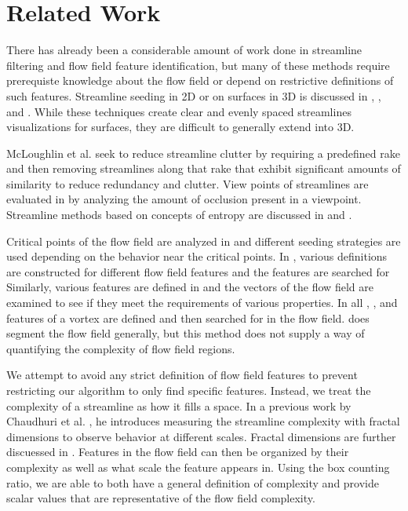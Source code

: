 \documentclass{egpubl}
\begin{document}
\section{Related Work}

There has already been a considerable amount of work done in streamline filtering and flow field feature identification, but many of these methods require prerequiste knowledge about the flow field or depend on restrictive definitions of such features.
Streamline seeding in 2D or on surfaces in 3D is discussed in \cite{turk}, \cite{mao}, and \cite{mebarki}.
While these techniques create clear and evenly spaced streamlines visualizations for surfaces, they are difficult to generally extend into 3D.

McLoughlin et al. \cite{mcloughlin} seek to reduce streamline clutter by requiring a predefined rake and then removing streamlines along that rake that exhibit significant amounts of similarity to reduce redundancy and clutter.
View points of streamlines are evaluated in \cite{marchesin} by analyzing the amount of occlusion present in a viewpoint.
Streamline methods based on concepts of entropy are discussed in \cite{shen} and \cite{lee}.

Critical points of the flow field are analyzed in \cite{ye} and different seeding strategies are used depending on the behavior near the critical points.
In \cite{salzbrunn}, various definitions are constructed for different flow field features and the features are searched for
Similarly, various features are defined in \cite{heiberg} and the vectors of the flow field are examined to see if they meet the requirements of various properties.
In all \cite{sadarjoen1999}, \cite{sadarjoen1998}, and \cite{zhong} features of a vortex are defined and then searched for in the flow field.
\cite{mahrous} does segment the flow field generally, but this method does not supply a way of quantifying the complexity of flow field regions.

We attempt to avoid any strict definition of flow field features to prevent restricting our algorithm to only find specific features.
Instead, we treat the complexity of a streamline as how it fills a space.
In a previous work by Chaudhuri et al. \cite{chaudhuri}, he introduces measuring the streamline complexity with fractal dimensions to observe behavior at different scales.
Fractal dimensions are further discuessed in \cite{khoury}.
Features in the flow field can then be organized by their complexity as well as what scale the feature appears in.
Using the box counting ratio, we are able to both have a general definition of complexity and provide scalar values that are representative of the flow field complexity.
\end{document}

